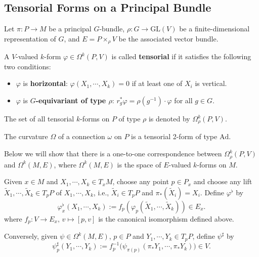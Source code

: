 
\subsection{Tensorial Forms on a Principal Bundle}
Let $\pi: P\to M$ be a principal $G$-bundle, $\rho:G\to \mathrm{GL}(V)$ be a finite-dimensional representation of $G$, 
and $E=P\times_\rho V$ be the associated vector bundle.
\begin{definition}
    A $V$-valued $k$-form $\varphi\in\Omega^k(P, V)$ is called \textbf{tensorial} if it satisfies the following two conditions:
    \begin{itemize}
        \item $\varphi$ is \textbf{horizontal}: $\varphi(X_1, \cdots, X_k)=0$ if at least one of $X_i$ is vertical.
        \item $\varphi$ is \textbf{$G$-equivariant of type $\rho$}: $r_g^*\varphi = \rho(g^{-1})\cdot\varphi$ for all $g\in G$.
    \end{itemize}
    The set of all tensorial $k$-forms on $P$ of type $\rho$ is denoted by $\Omega^k_{\rho}(P, V)$.
\end{definition}
\begin{example}
    The curvature $\Omega$ of a connection $\omega$ on $P$ is a tensorial 2-form of type $\mathrm{Ad}$.
\end{example}
Below we will show that there is a one-to-one correspondence between $\Omega^k_{\rho}(P, V)$ and $\Omega^k(M, E)$, 
where $\Omega^k(M, E)$ is the space of $E$-valued $k$-forms on $M$. 
\begin{definition}
    Given $x\in M$ and $X_1, \cdots, X_k\in T_xM$, choose any point $p\in P_x$ 
    and choose any lift $\tilde{X}_1, \cdots, \tilde{X}_k\in T_pP$ of $X_1, \cdots, X_k$, i.e., 
    $\tilde{X}_i\in T_pP$ and $\pi_*(\tilde{X}_i) = X_i$. Define $\varphi^\flat$ by
    \begin{equation*}
        \varphi_x^\flat(X_1, \cdots, X_k) := f_p(\varphi_p(\tilde{X}_1, \cdots, \tilde{X}_k)) \in E_x.  
    \end{equation*}
    where $f_p: V\to E_x,\,v\mapsto [p, v]$ is the canonical isomorphism defined above.

    Conversely, given $\psi\in\Omega^k(M, E)$, $p\in P$ and $Y_1, \cdots, Y_k\in T_pP$, define $\psi^\sharp$ by
    \begin{equation*}
        \psi_p^\sharp(Y_1, \cdots, Y_k) := f_p^{-1}\big(\psi_{\pi(p)}(\pi_*Y_1, \cdots, \pi_*Y_k)\big) \in V.
    \end{equation*}
\end{definition}
